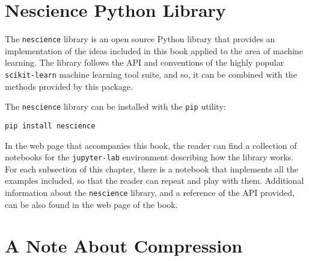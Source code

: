 %
%

\section{Nescience Python Library}

The \texttt{nescience} library is an open source Python library that provides an implementation of the ideas included in this book applied to the area of machine learning. The library follows the API and conventions of the highly popular \texttt{scikit-learn} machine learning tool suite, and so, it can be combined with the methods provided by this package.

The \texttt{nescience} library can be installed with the \texttt{pip} utility:

\begin{sourcecode}
{\scriptsize \begin{verbatim}
pip install nescience
\end{verbatim}}
\end{sourcecode}

In the web page that accompanies this book, the reader can find a collection of notebooks for the \texttt{jupyter-lab} environment describing how the library works. For each subsection of this chapter, there is a notebook that implements all the examples included, so that the reader can repeat and play with them. Additional information about the \texttt{nescience} library, and a reference of the API provided, can be also found in the web page of the book.

%
%
\section{A Note About Compression}
\label{sec:note_about_compression}

